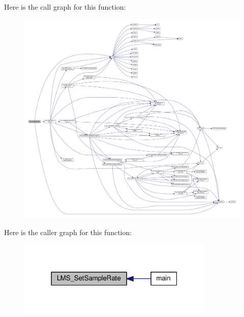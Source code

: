 Here is the call graph for this function\+:
\nopagebreak
\begin{figure}[H]
\begin{center}
\leavevmode
\includegraphics[width=350pt]{df/de1/lms7__api_8cpp_a545f1221449b14be75f3f7855af13dfa_cgraph}
\end{center}
\end{figure}




Here is the caller graph for this function\+:
\nopagebreak
\begin{figure}[H]
\begin{center}
\leavevmode
\includegraphics[width=265pt]{df/de1/lms7__api_8cpp_a545f1221449b14be75f3f7855af13dfa_icgraph}
\end{center}
\end{figure}


